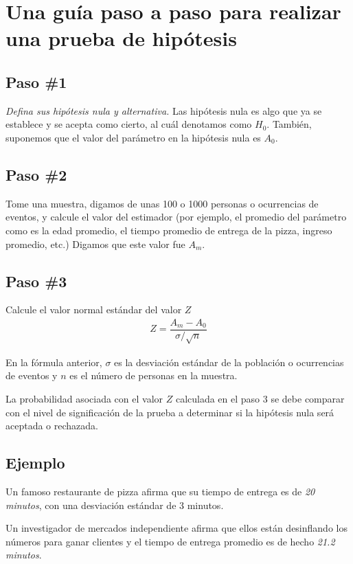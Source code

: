 \section*{Una guía paso a paso para realizar una prueba de hipótesis}
\subsection*{Paso \#1}
\emph{Defina sus hipótesis nula y alternativa.} Las hipótesis nula es algo que ya se establece y se acepta como cierto, al cuál denotamos como $H_{0}.$ También, suponemos que el valor del parámetro en la hipótesis nula es $A_{0}.$

\subsection*{Paso \#2}
Tome una muestra, digamos de unas 100 o 1000 personas o ocurrencias de eventos, y calcule el valor del estimador (por ejemplo, el promedio del parámetro como es la edad promedio, el tiempo promedio de entrega de la pizza, ingreso promedio, etc.) Digamos que este valor fue $A_{m}.$

\subsection*{Paso \#3}
Calcule el valor normal estándar del valor $Z$
\begin{align}
	Z=\dfrac{A_{m}-A_{0}}{\sigma/\sqrt{n}}
\end{align}



En la fórmula anterior, $\sigma$ es la desviación estándar de la población o ocurrencias de eventos y $n$ es el número de personas en la muestra.


La probabilidad asociada con el valor $Z$ calculada en el paso $3$ se debe comparar con el nivel de significación de la prueba a determinar si la hipótesis nula será aceptada o rechazada.

\subsection*{Ejemplo}
Un famoso restaurante de pizza afirma que su tiempo de entrega es de \emph{20 minutos}, con una desviación estándar de 3 minutos. 

Un investigador de mercados independiente afirma que ellos están desinflando los números para ganar clientes y el tiempo de entrega promedio es de hecho \emph{21.2 minutos}.

